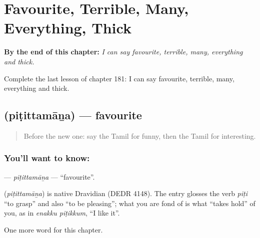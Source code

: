 
\chapter{Favourite, Terrible, Many, Everything, Thick}
\label{ch:ta-favourite-terrible-many-everything-thick}

\begin{chapteropening}
\textbf{By the end of this chapter:} \emph{I can say favourite, terrible, many, everything and thick.}

Complete the last lesson of chapter 181: I can say favourite, terrible, many, everything and thick.
\end{chapteropening}

\section[\texorpdfstring{\ta{பிடித்தமான} (piṭittamāṉa)}{பிடித்தமான (piṭittamāṉa)}]{ (piṭittamāṉa) — favourite}

\label{lesson:TA-C181-pitittamana}



\begin{quote}
Before the new one: say the Tamil for funny, then the Tamil for interesting.
\end{quote}

\subsection*{You'll want to know: }
\textbf{} — \emph{piṭittamāṉa} — \textquotedblleft{}favourite\textquotedblright{}.

\begin{cousinweb}
\textbf{} (\emph{piṭittamāṉa}) is native Dravidian (DEDR 4148). The entry glosses the verb \emph{piṭi} \textquotedblleft{}to grasp\textquotedblright{} and also \textquotedblleft{}to be pleasing\textquotedblright{}; what you are fond of is what \textquotedblleft{}takes hold\textquotedblright{} of you, as in \emph{enakku piṭikkum}, \textquotedblleft{}I like it\textquotedblright{}.
\end{cousinweb}

\begin{grammarlens}[title={What you've built}]
One more word for this chapter.
\end{grammarlens}

